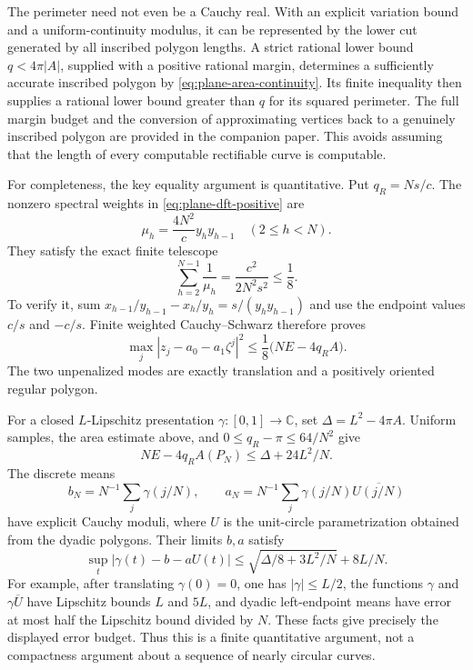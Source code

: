 The perimeter need not even be a Cauchy real.  With an explicit
variation bound and a uniform-continuity modulus, it can be represented
by the lower cut generated by all inscribed polygon lengths.  A strict
rational lower bound \(q<4\pi|A|\), supplied with a positive rational
margin, determines a sufficiently accurate inscribed polygon by
\eqref{eq:plane-area-continuity}.  Its finite inequality then supplies
a rational lower bound greater than \(q\) for its squared perimeter.
The full margin budget and the conversion of approximating vertices
back to a genuinely inscribed polygon are provided in the companion
paper.  This avoids assuming that the length of every computable
rectifiable curve is computable.

For completeness, the key equality argument is quantitative.  Put
\(q_R=Ns/c\).  The nonzero spectral weights in
\eqref{eq:plane-dft-positive} are
\[
 \mu_h=\frac{4N^2}{c}y_hy_{h-1}\quad(2\le h<N).
\]
They satisfy the exact finite telescope
\[
 \sum_{h=2}^{N-1}\frac1{\mu_h}
 =\frac{c^2}{2N^2s^2}\le\frac18.
\]
To verify it, sum
\(x_{h-1}/y_{h-1}-x_h/y_h=s/(y_hy_{h-1})\)
and use the endpoint values \(c/s\) and \(-c/s\).
Finite weighted Cauchy--Schwarz therefore proves
\begin{equation}\label{eq:plane-finite-stability}
 \max_j|z_j-a_0-a_1\zeta^j|^2
 \le\frac18\bigl(NE-4q_RA\bigr).
\end{equation}
The two unpenalized modes are exactly translation and a positively
oriented regular polygon.

For a closed \(L\)-Lipschitz presentation
\(\gamma:[0,1]\to\mathbb C\), set
\(\Delta=L^2-4\pi A\).  Uniform samples, the area estimate above,
and \(0\le q_R-\pi\le64/N^2\) give
\[
 NE-4q_RA(P_N)\le\Delta+24L^2/N.
\]
The discrete means
\[
 b_N=N^{-1}\sum_j\gamma(j/N),\qquad
 a_N=N^{-1}\sum_j\gamma(j/N)\overline{U(j/N)}
\]
have explicit Cauchy moduli, where \(U\) is the unit-circle
parametrization obtained from the dyadic polygons.  Their limits
\(b,a\) satisfy
\begin{equation}\label{eq:plane-uniform-stability}
 \sup_t|\gamma(t)-b-aU(t)|
 \le\sqrt{\Delta/8+3L^2/N}+8L/N.
\end{equation}
For example, after translating \(\gamma(0)=0\), one has
\(|\gamma|\le L/2\), the functions \(\gamma\) and
\(\gamma\overline U\) have Lipschitz bounds \(L\) and \(5L\),
and dyadic left-endpoint means have error at most half the Lipschitz
bound divided by \(N\).  These facts give precisely the displayed
error budget.  Thus this is a finite quantitative argument, not a
compactness argument about a sequence of nearly circular curves.

